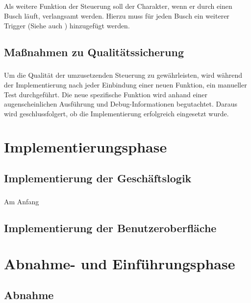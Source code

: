 \paragraph{}
Als weitere Funktion der Steuerung soll der Charakter, wenn er durch einen Busch läuft, verlangsamt werden. Hierzu muss für jeden Busch ein weiterer Trigger (Siehe auch ) hinzugefügt werden.

\section{Maßnahmen zu Qualitätssicherung}
\paragraph{}
Um die Qualität der umzusetzenden Steuerung zu gewährleisten, wird während der Implementierung nach jeder Einbindung einer neuen Funktion, ein manueller Test durchgeführt. Die neue spezifische Funktion wird anhand einer augenscheinlichen Ausführung und Debug-Informationen begutachtet. Daraus wird geschlussfolgert, ob die Implementierung erfolgreich eingesetzt wurde.

\chapter{Implementierungsphase}
\section{Implementierung der Geschäftslogik}
\paragraph{}
Am Anfang 

\section{Implementierung der Benutzeroberfläche}
\paragraph{}

\chapter{Abnahme- und Einführungsphase}

\section{Abnahme}
